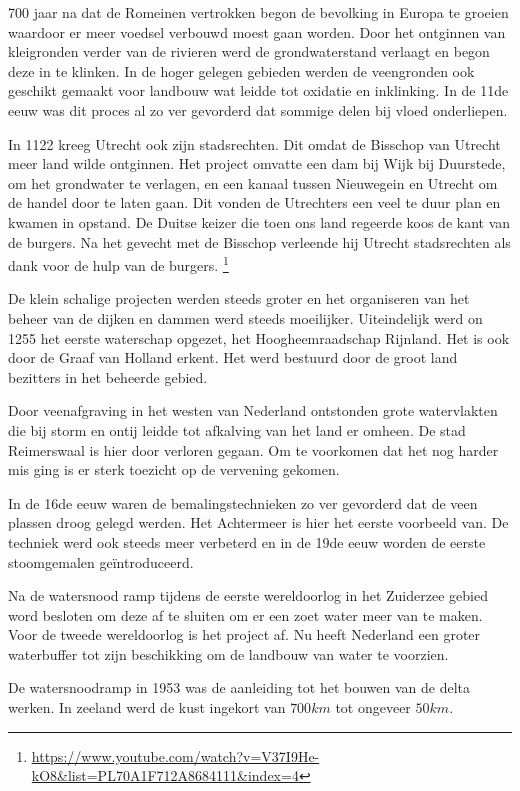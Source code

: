 700 jaar na dat de Romeinen vertrokken begon de bevolking in Europa te groeien waardoor er meer voedsel verbouwd moest gaan worden.
Door het ontginnen van kleigronden verder van de rivieren werd de grondwaterstand verlaagt en begon deze in te klinken.
In de hoger gelegen gebieden werden de veengronden ook geschikt gemaakt voor landbouw wat leidde tot oxidatie en inklinking.
In de 11de eeuw was dit proces al zo ver gevorderd dat sommige delen bij vloed onderliepen.

In 1122 kreeg Utrecht ook zijn stadsrechten.
Dit omdat de Bisschop van Utrecht meer land wilde ontginnen.
Het project omvatte een dam bij Wijk bij Duurstede, om het grondwater te verlagen,
en een kanaal tussen Nieuwegein en Utrecht om de handel door te laten gaan.
Dit vonden de Utrechters een veel te duur plan en kwamen in opstand.
De Duitse keizer die toen ons land regeerde koos de kant van de burgers.
Na het gevecht met de Bisschop verleende hij Utrecht stadsrechten als dank voor de hulp van de burgers.
\footnote{\url{https://www.youtube.com/watch?v=V37I9He-kO8&list=PL70A1F712A8684111&index=4}}

De klein schalige projecten werden steeds groter en het organiseren van het beheer van de dijken en dammen werd steeds moeilijker.
Uiteindelijk werd on 1255 het eerste waterschap opgezet, het Hoogheemraadschap Rijnland.
Het is ook door de Graaf van Holland erkent.
Het werd bestuurd door de groot land bezitters in het beheerde gebied.

Door veenafgraving in het westen van Nederland ontstonden grote watervlakten die bij storm en ontij leidde tot afkalving van het land er omheen.
De stad Reimerswaal is hier door verloren gegaan.
Om te voorkomen dat het nog harder mis ging is er sterk toezicht op de vervening gekomen.

In de 16de eeuw waren de bemalingstechnieken zo ver gevorderd dat de veen plassen droog gelegd werden.
Het Achtermeer is hier het eerste voorbeeld van.
De techniek werd ook steeds meer verbeterd en in de 19de eeuw worden de eerste stoomgemalen geïntroduceerd.

Na de watersnood ramp tijdens de eerste wereldoorlog in het Zuiderzee gebied word besloten om deze af te sluiten om er een zoet water meer van te maken.
Voor de tweede wereldoorlog is het project af.
Nu heeft Nederland een groter waterbuffer tot zijn beschikking om de landbouw van water te voorzien.

De watersnoodramp in 1953 was de aanleiding tot het bouwen van de delta werken.
In zeeland werd de kust ingekort van $700 km$ tot ongeveer $50 km$.

